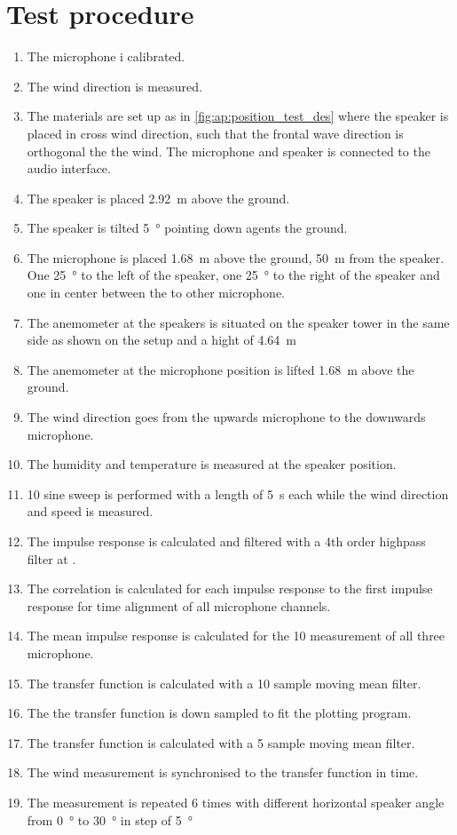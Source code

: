 \section*{Test procedure}


\begin{enumerate}
\item The microphone i calibrated.
\item The wind direction is measured.
\item The materials are set up as in \autoref{fig:ap:position_test_des} where the speaker is placed in cross wind direction, such that the frontal wave direction is orthogonal the the wind. The microphone and speaker is connected to the audio interface.
\item The speaker is placed \SI{2.92}{\meter} above the ground.
\item The speaker is tilted \SI{5}{\degree} pointing down agents the ground.
\item The microphone is placed \SI{1.68}{\meter} above the ground, \SI{50}{\meter} from the speaker. One \SI{25}{\degree} to the left of the speaker, one \SI{25}{\degree} to the right of the speaker and one in center between the to other microphone.
\item The anemometer at the speakers is situated on the speaker tower in the same side as shown on the setup and a hight of \SI{4.64}{\meter}
\item The anemometer at the microphone position is lifted \SI{1.68}{\meter} above the ground.
\item The wind direction goes from the upwards microphone to the downwards microphone.
\item The humidity and temperature is measured at the speaker position.
\item 10 sine sweep is performed with a length of \SI{5}{\second} each while the wind direction and speed is measured.
\item The impulse response is calculated and filtered with a 4th order highpass filter at .
\item The correlation is calculated for each impulse response to the first impulse response for time alignment \citep{gunness2001loudspeaker} of all microphone channels.
\item The mean impulse response is calculated for the 10 measurement of all three microphone.
\item The transfer function is calculated with a 10 sample moving mean filter.
\item The the transfer function is down sampled to fit the plotting program.
\item The transfer function is calculated with a 5 sample moving mean filter.
\item The wind measurement is synchronised to the transfer function in time. 
\item The measurement is repeated 6 times with different horizontal speaker angle from \SI{0}{\degree} to \SI{30}{\degree} in step of \SI{5}{\degree}
\end{enumerate}



